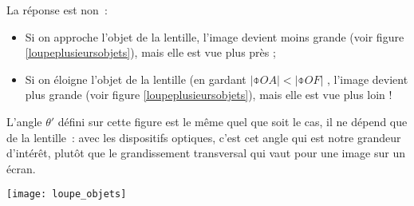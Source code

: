 \documentclass[../main/main.tex]{subfiles}
\begin{document}
\begin{minipage}[c]{0.45\linewidth}
    La réponse est non~:
    \begin{itemize}
        \item Si on approche l'objet de la lentille, l'image devient moins
            grande (voir figure \ref{loupeplusieursobjets}), mais elle est vue
            plus près ;
        \item Si on éloigne l'objet de la lentille (en gardant $|\obar{OA}| <
            |\obar{OF}|$ , l'image devient plus grande (voir figure
            \ref{loupeplusieursobjets}), mais elle est vue plus loin !
    \end{itemize}
    \medskip
    L'angle $\theta'$ défini sur cette figure est le même quel que soit le cas,
    il ne dépend que de la lentille~: avec les dispositifs optiques, c'est cet
    angle qui est notre grandeur d'intérêt, plutôt que le grandissement
    transversal qui vaut pour une image sur un écran.

\bigskip

\end{minipage}
\hfill 
\begin{minipage}[c]{0.45\linewidth}
    \begin{center}
        \texttt{[image: loupe\_objets]}
        \label{loupeplusieursobjets}
    \end{center}
\end{minipage}

\bigskip
\end{document}
